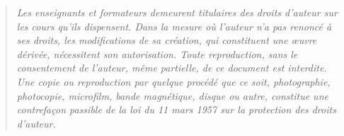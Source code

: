    \vspace {15cm}

   \begin {quote}
   \em Les enseignants et formateurs demeurent titulaires des droits d'auteur sur les cours qu'ils dispensent.    
Dans la mesure où l'auteur n'a pas renoncé à ses droits, les modifications de sa création, qui constituent une œuvre dérivée, nécessitent son autorisation. 
    Toute  reproduction,  sans le consentement de l'auteur, 
    même  partielle,  de ce document est
    interdite.  Une copie ou reproduction  par quelque procédé que
    ce   soit,   photographie,    photocopie,   microfilm,   bande
    magnétique,   disque  ou  autre,   constitue  une  contrefaçon
   passible  de la loi du 11  mars  1957  sur la  protection  des
    droits d'auteur.
    \end {quote}
\newpage


\setcounter{page}{1}

\tableofcontents
\newpage
~ %
\newpage

%
%
%



 \newpage

 \newpage


 \newpage
 \newpage
 \newpage
                         \newpage
                         \newpage



\newpage
 \newpage
 \newpage
 \newpage


 \newpage


 \newpage
 \newpage
 \newpage
 \newpage

